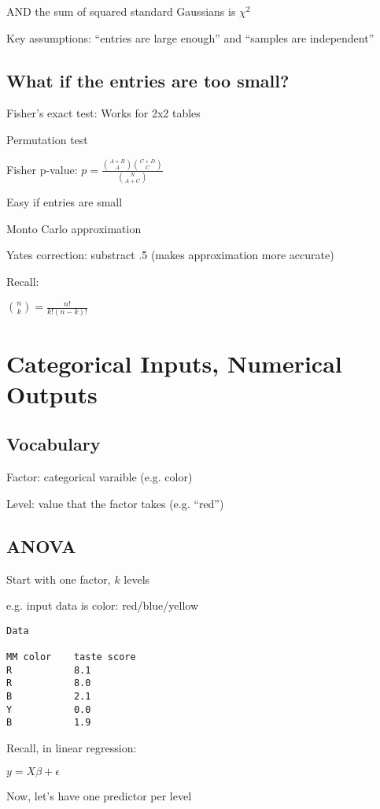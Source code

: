 \documentclass[twoside]{article}
\begin{document}
AND the sum of squared standard Gaussians is $\chi^2$

Key assumptions: ``entries are large enough'' and ``samples are independent''

\subsection{What if the entries are too small?}

Fisher's exact test: Works for 2x2 tables

Permutation test

Fisher p-value: $p = \frac{\binom{A+B}{A}\binom{C+D}{C}}{\binom{N}{A+C}}$

Easy if entries are small

Monto Carlo approximation

Yates correction: substract .5 (makes approximation more accurate)

Recall: 

$\binom{n}{k} = \frac{n!}{k!(n-k)!}$

\section{Categorical Inputs, Numerical Outputs}

\subsection{Vocabulary}

Factor: categorical varaible (e.g. color)

Level: value that the factor takes (e.g. ``red'')

\subsection{ANOVA}

Start with one factor, $k$ levels

e.g. input data is color: red/blue/yellow

\begin{verbatim}
Data

MM color    taste score
R           8.1
R           8.0
B           2.1
Y           0.0
B           1.9
\end{verbatim}

Recall, in linear regression:

$y = X\beta + \epsilon$

Now, let's have one predictor per level 
\end{document}
